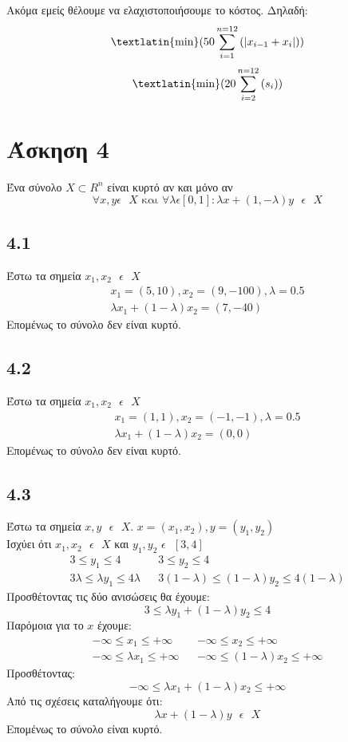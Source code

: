 \documentclass[12pt]{report}
\begin{document}
Ακόμα εμείς θέλουμε να ελαχιστοποιήσουμε το κόστος. Δηλαδή:
$$
    \text{\textlatin{min}}{(50 \sum^{n = 12}_{i=1}{(|x_{i-1} + x_i|)})}
$$
$$
    \text{\textlatin{min}}{(20 \sum^{n = 12}_{i=2}{(s_i)})}
$$

\clearpage
\section*{Άσκηση 4}
Ένα σύνολο $X \subset R^n $ είναι κυρτό αν και μόνο αν \\
$$ \forall x,y \epsilon \text{ } X \text{ και } \forall \lambda \epsilon
    {[0,1]} : \lambda x+(1,-\lambda)y \text{ }\epsilon \text{ }X $$
\subsection*{4.1}
Έστω τα σημεία $x_1 , x_2 \text{ }\epsilon \text{ } X$\\
$$
    \begin{array}{l}
        x_1 = (5 , 10) , x_2 = (9 , -100), \lambda = 0.5 \\
        \lambda x_1 + (1 - \lambda) x_2 = (7 , -40)
    \end{array}
$$
Επομένως το σύνολο δεν είναι κυρτό.
\subsection*{4.2}
Έστω τα σημεία $x_1 , x_2 \text{ }\epsilon \text{ } X$\\
$$
    \begin{array}{l}
        x_1 = (1 , 1) , x_2 = (-1 , -1), \lambda = 0.5 \\
        \lambda x_1 + (1 - \lambda) x_2 = (0 , 0)
    \end{array}
$$
Επομένως το σύνολο δεν είναι κυρτό.
\subsection*{4.3}
Έστω τα σημεία $x , y \text{ }\epsilon \text{ } X.$ $x = {(x_1 , x_2)} , y =
        {(y_1 , y_2)}$ \\
Ισχύει ότι $x_1 , x_2 \text{ }\epsilon \text{ } X$ και $ y_1 , y_2 \text{
    }\epsilon \text{ } {[3,4]}$
$$
    \begin{array}{lcl}
        3 \leq y_1 \leq 4                         & {} & 3 \leq y_2 \leq 4                \\
        3 \lambda \leq \lambda y_1 \leq 4 \lambda & {} & 3(1 - \lambda) \leq (1- \lambda)
        y_2 \leq 4 (1- \lambda)
    \end{array}
$$
Προσθέτοντας τις δύο ανισώσεις θα έχουμε:
$$ 3 \leq \lambda y_1 + (1- \lambda) y_2 \leq 4 $$
Παρόμοια για το $x$ έχουμε:
$$
    \begin{array}{lcl}
        -\infty \leq x_1 \leq + \infty        & {} & -\infty \leq x_2 \leq +\infty      \\
        -\infty \leq \lambda x_1 \leq +\infty & {} & -\infty \leq (1- \lambda) x_2 \leq
        +\infty
    \end{array}
$$
Προσθέτοντας:
$$ -\infty \leq \lambda x_1 + (1- \lambda) x_2 \leq +\infty $$
Από τις σχέσεις καταλήγουμε ότι:
$$ \lambda x + (1 - \lambda) y \text{ }\epsilon \text{ } X$$
Επομένως το σύνολο είναι κυρτό.
\clearpage
\end{document}
